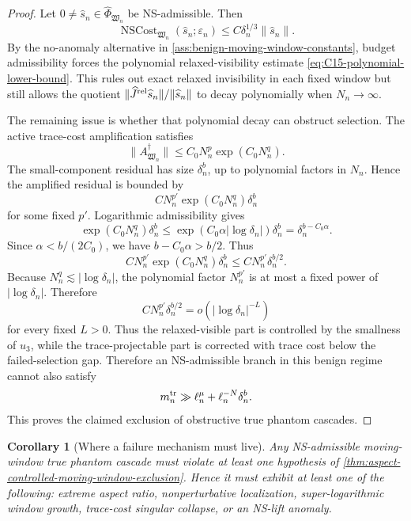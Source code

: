 \documentclass[11pt]{article}
\numberwithin{equation}{section}
\newtheorem{corollary}[theorem]{Corollary}
\newcommand{\eps}{\varepsilon}
\begin{document}
\begin{proof}
Let \(0\neq\widehat s_n\in\widehat\Phi_{\mathfrak W_n}\) be NS-admissible.  Then
\[
        \operatorname{NSCost}_{\mathfrak W_n}(\widehat s_n;\eps_n)
        \le C\delta_n^{1/3}\|\widehat s_n\|.
\]
By the no-anomaly alternative in \cref{ass:benign-moving-window-constants}, budget admissibility forces the polynomial relaxed-visibility estimate \eqref{eq:C15-polynomial-lower-bound}.  This rules out exact relaxed invisibility in each fixed window but still allows the quotient \(\|\widehat J^{\rm rel}\widehat s_n\|/\|\widehat s_n\|\) to decay polynomially when \(N_n\to\infty\).

The remaining issue is whether that polynomial decay can obstruct selection.  The active trace-cost amplification satisfies
\[
        \|A_{\mathfrak W_n}^{\dagger}\|
        \le C_0N_n^p\exp(C_0N_n^q).
\]
The small-component residual has size \(\delta_n^b\), up to polynomial factors in \(N_n\).  Hence the amplified residual is bounded by
\[
        C N_n^{p'}\exp(C_0N_n^q)\delta_n^b
\]
for some fixed \(p'\).  Logarithmic admissibility gives
\[
        \exp(C_0N_n^q)\delta_n^b
        \le
        \exp(C_0\alpha |\log\delta_n|)\delta_n^b
        =
        \delta_n^{b-C_0\alpha}.
\]
Since \(\alpha<b/(2C_0)\), we have \(b-C_0\alpha>b/2\). Thus
\[
        C N_n^{p'}\exp(C_0N_n^q)\delta_n^b
        \le C N_n^{p'}\delta_n^{b/2}.
\]
Because \(N_n^q\lesssim |\log\delta_n|\), the polynomial factor \(N_n^{p'}\) is at most a fixed power of \(|\log\delta_n|\). Therefore
\[
        C N_n^{p'}\delta_n^{b/2}
        =o(|\log\delta_n|^{-L})
\]
for every fixed \(L>0\).  Thus the relaxed-visible part is controlled by the smallness of \(u_3\), while the trace-projectable part is corrected with trace cost below the failed-selection gap.  Therefore an NS-admissible branch in this benign regime cannot also satisfy
\[
        m_n^{\rm tr}\gg \ell_n^\mu+\ell_n^{-N}\delta_n^b.
\]
This proves the claimed exclusion of obstructive true phantom cascades.
\end{proof}

\begin{corollary}[Where a failure mechanism must live]\label{cor:where-failure-must-live}
Any NS-admissible moving-window true phantom cascade must violate at least one hypothesis of \cref{thm:aspect-controlled-moving-window-exclusion}.  Hence it must exhibit at least one of the following: extreme aspect ratio, nonperturbative localization, super-logarithmic window growth, trace-cost singular collapse, or an NS-lift anomaly.
\end{corollary}
\end{document}
